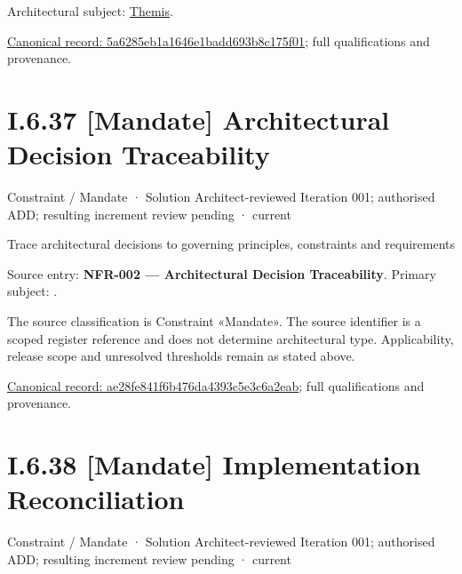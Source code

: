 Architectural subject: \hyperref[element:899d34ec491948b68aad09e507dea6d1]{Themis}.


{\footnotesize \href{../../../../../../../continuum/motivation/constraint/5a6285eb1a1646e1badd693b8c175f01.md}{Canonical record: 5a6285eb1a1646e1badd693b8c175f01}; full qualifications and provenance.}\par
\section*{I.6.37 [Mandate] Architectural Decision Traceability}
\label{navigation:I.6.37}

\label{element:ae28fe841f6b476da4393c5e3c6a2eab}
{\small Constraint / Mandate · Solution Architect-reviewed Iteration 001; authorised ADD; resulting increment review pending · current}\par

Trace architectural decisions to governing principles, constraints and requirements



Source entry: \textbf{NFR-002 — Architectural Decision Traceability}. Primary subject: \texttt{}.



The source classification is Constraint «Mandate». The source identifier is a scoped register reference and does not determine architectural type. Applicability, release scope and unresolved thresholds remain as stated above.


{\footnotesize \href{../../../../../../../continuum/motivation/constraint/mandate/ae28fe841f6b476da4393c5e3c6a2eab.md}{Canonical record: ae28fe841f6b476da4393c5e3c6a2eab}; full qualifications and provenance.}\par
\section*{I.6.38 [Mandate] Implementation Reconciliation}
\label{navigation:I.6.38}

\label{element:5acccfa8cf634669a26bb31010926720}
{\small Constraint / Mandate · Solution Architect-reviewed Iteration 001; authorised ADD; resulting increment review pending · current}\par

